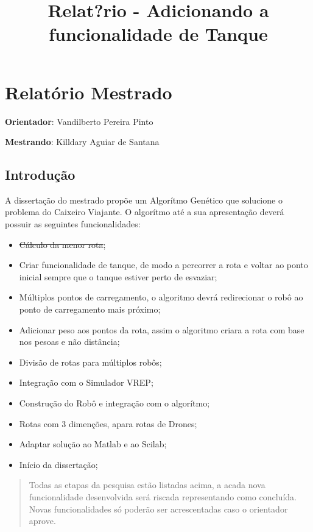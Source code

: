 \documentclass[11pt]{article}
\title{Relat?rio - Adicionando a funcionalidade de Tanque}
\providecommand{\tightlist}{%
      \setlength{\itemsep}{0pt}\setlength{\parskip}{0pt}}
\begin{document}
    
    
    \maketitle
    
    

    
    \section{Relatório Mestrado}\label{relatuxf3rio-mestrado}

\textbf{Orientador}: Vandilberto Pereira Pinto

\textbf{Mestrando}: Killdary Aguiar de Santana

    \subsection{Introdução}\label{introduuxe7uxe3o}

A dissertação do mestrado propõe um Algorítmo Genético que solucione o
problema do Caixeiro Viajante. O algorítmo até a sua apresentação deverá
possuir as seguintes funcionalidades:

\begin{itemize}
\tightlist
\item
  \sout{Cálculo da menor rota};
\item
  Criar funcionalidade de tanque, de modo a percorrer a rota e voltar ao
  ponto inicial sempre que o tanque estiver perto de esvaziar;
\item
  Múltiplos pontos de carregamento, o algoritmo devrá redirecionar o
  robô ao ponto de carregamento mais próximo;
\item
  Adicionar peso aos pontos da rota, assim o algoritmo criara a rota com
  base nos pesoas e não distância;
\item
  Divisão de rotas para múltiplos robôs;
\item
  Integração com o Simulador VREP;
\item
  Construção do Robô e integração com o algorítmo;
\item
  Rotas com 3 dimenções, apara rotas de Drones;
\item
  Adaptar solução ao Matlab e ao Scilab;
\item
  Início da dissertação;
\end{itemize}

\begin{quote}
Todas as etapas da pesquisa estão listadas acima, a acada nova
funcionalidade desenvolvida será riscada representando como concluída.
Novas funcionalidades só poderão ser acrescentadas caso o orientador
aprove.
\end{quote}
\end{document}
